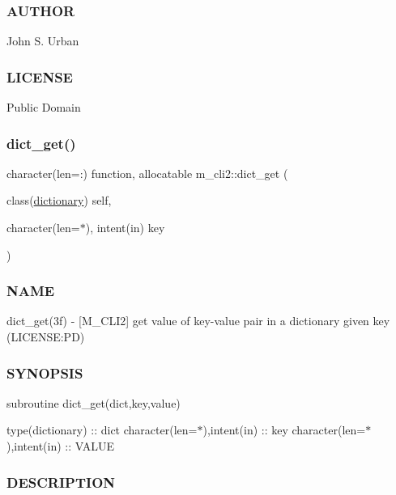 \subsubsection*{A\+U\+T\+H\+OR}

John S. Urban \subsubsection*{L\+I\+C\+E\+N\+SE}

Public Domain \mbox{\label{namespacem__cli2_a5b489c992f1434fa27e7858a483a38c7}} 
\subsubsection{\texorpdfstring{dict\+\_\+get()}{dict\_get()}}
{\footnotesize\ttfamily character(len=\+:) function, allocatable m\+\_\+cli2\+::dict\+\_\+get (\begin{DoxyParamCaption}\item[{class(\mbox{\hyperlink{structm__cli2_1_1dictionary}{dictionary}})}]{self,  }\item[{character(len=$\ast$), intent(in)}]{key }\end{DoxyParamCaption})\hspace{0.3cm}{\ttfamily [private]}}



\subsubsection*{N\+A\+ME}

dict\+\_\+get(3f) -\/ \mbox{[}M\+\_\+\+C\+L\+I2\mbox{]} get value of key-\/value pair in a dictionary given key (L\+I\+C\+E\+N\+SE\+:PD) 

\subsubsection*{S\+Y\+N\+O\+P\+S\+IS}

subroutine dict\+\_\+get(dict,key,value)

type(dictionary) \+:\+: dict character(len=$\ast$),intent(in) \+:\+: key character(len=$\ast$),intent(in) \+:\+: V\+A\+L\+UE

\subsubsection*{D\+E\+S\+C\+R\+I\+P\+T\+I\+ON}

